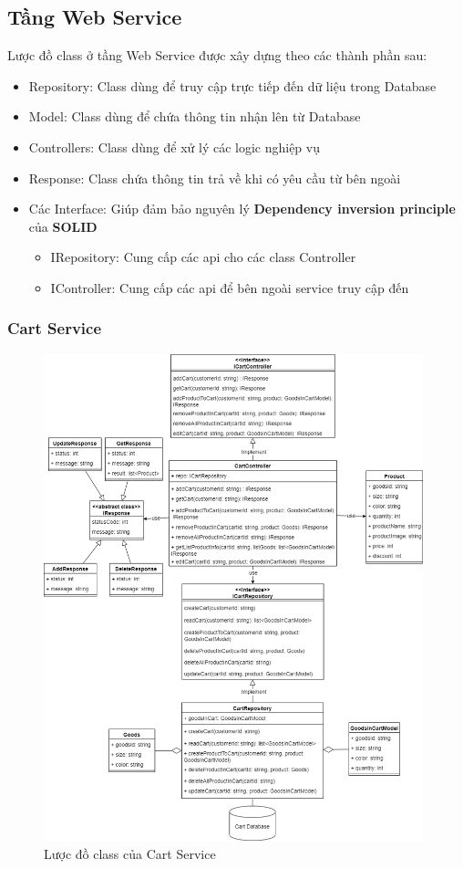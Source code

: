 \subsection{Tầng Web Service}

Lược đồ class ở tầng Web Service được xây dựng theo các thành phần sau:
\begin{itemize}
	\item Repository: Class dùng để truy cập trực tiếp đến dữ liệu trong Database
	\item Model: Class dùng để chứa thông tin nhận lên từ Database
	\item Controllers: Class dùng để xử lý các logic nghiệp vụ
	\item Response: Class chứa thông tin trả về khi có yêu cầu từ bên ngoài
	\item Các Interface: Giúp đảm bảo nguyên lý \textbf{Dependency inversion principle} của \textbf{SOLID}
	      \begin {itemize}
	\item IRepository: Cung cấp các api cho các class Controller
	\item IController: Cung cấp các api để bên ngoài service truy cập đến
\end{itemize}
\end{itemize}

\newpage

\subsubsection{Cart Service}
\begin{figure}[!htp]
	\centering
	\includegraphics[width=11cm]{img/Architecture/service/CartService.png}
	\newline
	\caption{Lược đồ class của Cart Service}
\end{figure}

